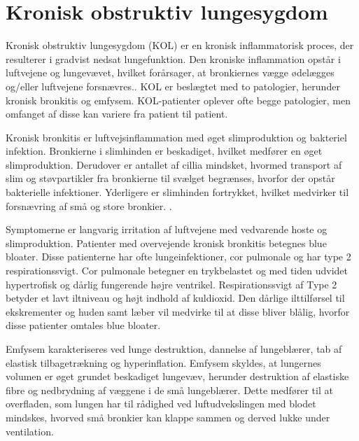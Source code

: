 \section{Kronisk obstruktiv lungesygdom}
Kronisk obstruktiv lungesygdom (KOL) er en kronisk inflammatorisk proces, der resulterer i gradvist nedsat lungefunktion. Den kroniske inflammation opstår i luftvejene og lungevævet, hvilket forårsager, at bronkiernes vægge ødelægges og/eller luftvejene forsnævres.\cite{Basisbogen2016}. KOL er beslægtet med to patologier, herunder kronisk bronkitis og emfysem. KOL-patienter oplever ofte begge patologier, men omfanget af disse kan variere fra patient til patient.\cite{Basisbogen2016,Healthguidances2016}

Kronisk bronkitis er luftvejsinflammation med øget slimproduktion og bakteriel infektion. Bronkierne i slimhinden er beskadiget, hvilket medfører en øget slimproduktion. Derudover er antallet af cillia mindsket, hvormed transport af slim og støvpartikler fra bronkierne til svælget begrænses, hvorfor der opstår bakterielle infektioner. Yderligere er slimhinden fortrykket, hvilket medvirker til forsnævring af små og store bronkier. \cite{Frausing2011, Britannica2016}. 

\noindent
Symptomerne er langvarig irritation af luftvejene med vedvarende hoste og slimproduktion. Patienter med overvejende kronisk bronkitis betegnes blue bloater. Disse patienterne har ofte lungeinfektioner, cor pulmonale og har type 2 respirationssvigt. Cor pulmonale betegner en trykbelastet og med tiden udvidet hypertrofisk og dårlig fungerende højre ventrikel. Respirationssvigt af Type 2 betyder et lavt iltniveau og højt indhold af kuldioxid. Den dårlige ilttilførsel til ekskrementer og huden samt læber vil medvirke til at disse bliver blålig, hvorfor disse patienter omtales blue bloater. \cite{Healthguidances2016}

Emfysem karakteriseres ved lunge destruktion, dannelse af lungeblærer, tab af elastisk tilbagetrækning og hyperinflation. Emfysem skyldes, at lungernes volumen er øget grundet beskadiget lungevæv, herunder destruktion af elastiske fibre og nedbrydning af væggene i de små lungeblærer. Dette medfører til at overfladen, som lungen har til rådighed ved luftudvekslingen med blodet mindskes, hvorved små bronkier kan klappe sammen og derved lukke under ventilation.\cite{Frausing2011a,Flaschen-Hansen2008}

